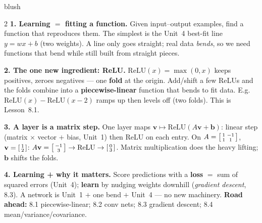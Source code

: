 \documentclass[10pt]{article}
\newcommand{\vv}{\mathbf{v}}
\newcommand{\bb}{\mathbf{b}}
\newcommand{\relu}{\mathrm{ReLU}}
\begin{document}
\begin{skillbox}[Lesson]{blush}
\begin{multicols}{2}
\textbf{1. Learning $=$ fitting a function.} Given input--output examples, find a function that reproduces
them. The simplest is the Unit~4 best-fit line $y=wx+b$ (two weights). A line only goes straight; real
data \emph{bends}, so we need functions that bend while still built from straight pieces.

\textbf{2. The one new ingredient: ReLU.} $\relu(x)=\max(0,x)$ keeps positives, zeroes negatives ---
one \textbf{fold} at the origin. Add/shift a few ReLUs and the folds combine into a
\textbf{piecewise-linear} function that bends to fit data. E.g.\ $\relu(x)-\relu(x-2)$ ramps up then
levels off (two folds). This is Lesson~8.1.

\columnbreak

\textbf{3. A layer is a matrix step.} One layer maps $\vv\mapsto\relu(A\vv+\bb)$: linear step (matrix
$\times$ vector $+$ bias, Unit~1) then ReLU on each entry. On $A=\begin{bsmallmatrix} 1 & -1\\ 1 & 1
\end{bsmallmatrix}$, $\vv=\begin{bsmallmatrix} 1\\2 \end{bsmallmatrix}$: $A\vv=\begin{bsmallmatrix} -1\\3
\end{bsmallmatrix}\to\relu\to\begin{bsmallmatrix} 0\\3 \end{bsmallmatrix}$. Matrix multiplication does the
heavy lifting; $\bb$ shifts the folds.

\textbf{4. Learning + why it matters.} Score predictions with a \textbf{loss} $=$ sum of squared errors
(Unit~4); \textbf{learn} by nudging weights downhill (\emph{gradient descent}, 8.3). A network is Unit~1
$+$ one bend $+$ Unit~4 --- no new machinery. \textbf{Road ahead:} 8.1 piecewise-linear; 8.2 conv nets;
8.3 gradient descent; 8.4 mean/variance/covariance.
\end{multicols}
\end{skillbox}
\end{document}
